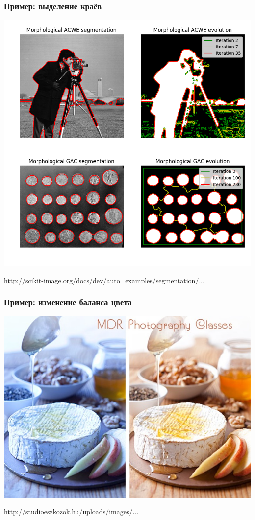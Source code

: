 \documentclass[fleqn, xcolor=x11names]{beamer}
\begin{document}
\begin{frame}[fragile]\frametitle{Пример: выделение краёв}

\centering\includegraphics[scale=0.35]{images/segmentation.png}

\href{http://scikit-image.org/docs/dev/auto_examples/segmentation/plot_morphsnakes.html#sphx-glr-auto-examples-segmentation-plot-morphsnakes-py}{http://scikit-image.org/docs/dev/auto\_examples/segmentation/...}
\end{frame}

\begin{frame}[fragile]\frametitle{Пример: изменение баланса цвета}
\centering\includegraphics[scale=0.35]{images/balance.jpg}

\hfill

\href{http://studioeszkozok.hu/uploads/images/7631179_1497473781_color-temp.jpg}{http://studioeszkozok.hu/uploads/images/...}
\end{frame}
\end{document}
